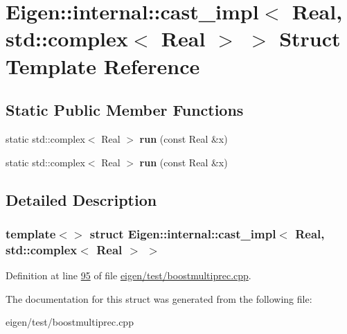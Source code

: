 \hypertarget{struct_eigen_1_1internal_1_1cast__impl_3_01_real_00_01std_1_1complex_3_01_real_01_4_01_4}{}\section{Eigen\+:\+:internal\+:\+:cast\+\_\+impl$<$ Real, std\+:\+:complex$<$ Real $>$ $>$ Struct Template Reference}
\label{struct_eigen_1_1internal_1_1cast__impl_3_01_real_00_01std_1_1complex_3_01_real_01_4_01_4}
\subsection*{Static Public Member Functions}
\begin{DoxyCompactItemize}
\item 
\mbox{\label{struct_eigen_1_1internal_1_1cast__impl_3_01_real_00_01std_1_1complex_3_01_real_01_4_01_4_ad3048cf16ee990327a1cf3679e39adf4}} 
static std\+::complex$<$ Real $>$ {\bfseries run} (const Real \&x)
\item 
\mbox{\label{struct_eigen_1_1internal_1_1cast__impl_3_01_real_00_01std_1_1complex_3_01_real_01_4_01_4_ad3048cf16ee990327a1cf3679e39adf4}} 
static std\+::complex$<$ Real $>$ {\bfseries run} (const Real \&x)
\end{DoxyCompactItemize}


\subsection{Detailed Description}
\subsubsection*{template$<$$>$\newline
struct Eigen\+::internal\+::cast\+\_\+impl$<$ Real, std\+::complex$<$ Real $>$ $>$}



Definition at line \hyperlink{eigen_2test_2boostmultiprec_8cpp_source_l00095}{95} of file \hyperlink{eigen_2test_2boostmultiprec_8cpp_source}{eigen/test/boostmultiprec.\+cpp}.



The documentation for this struct was generated from the following file\+:\begin{DoxyCompactItemize}
\item 
eigen/test/boostmultiprec.\+cpp\end{DoxyCompactItemize}
